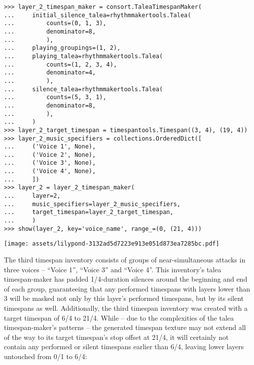 \begin{comment}
<abjad>
layer_2_timespan_maker = consort.TaleaTimespanMaker(
    initial_silence_talea=rhythmmakertools.Talea(
        counts=(0, 1, 3),
        denominator=8,
        ),
    playing_groupings=(1, 2),
    playing_talea=rhythmmakertools.Talea(
        counts=(1, 2, 3, 4),
        denominator=4,
        ),
    silence_talea=rhythmmakertools.Talea(
        counts=(5, 3, 1),
        denominator=8,
        ),
    )
layer_2_target_timespan = timespantools.Timespan((3, 4), (19, 4))
layer_2_music_specifiers = collections.OrderedDict([
    ('Voice 1', None),
    ('Voice 2', None),
    ('Voice 3', None),
    ('Voice 4', None),
    ])
layer_2 = layer_2_timespan_maker(
    layer=2,
    music_specifiers=layer_2_music_specifiers,
    target_timespan=layer_2_target_timespan,
    )
show(layer_2, key='voice_name', range_=(0, (21, 4)))
</abjad>
\end{comment}

\begin{abjadbookoutput}
\begin{singlespacing}
\vspace{-0.5\baselineskip}
\begin{verbatim}
>>> layer_2_timespan_maker = consort.TaleaTimespanMaker(
...     initial_silence_talea=rhythmmakertools.Talea(
...         counts=(0, 1, 3),
...         denominator=8,
...         ),
...     playing_groupings=(1, 2),
...     playing_talea=rhythmmakertools.Talea(
...         counts=(1, 2, 3, 4),
...         denominator=4,
...         ),
...     silence_talea=rhythmmakertools.Talea(
...         counts=(5, 3, 1),
...         denominator=8,
...         ),
...     )
>>> layer_2_target_timespan = timespantools.Timespan((3, 4), (19, 4))
>>> layer_2_music_specifiers = collections.OrderedDict([
...     ('Voice 1', None),
...     ('Voice 2', None),
...     ('Voice 3', None),
...     ('Voice 4', None),
...     ])
>>> layer_2 = layer_2_timespan_maker(
...     layer=2,
...     music_specifiers=layer_2_music_specifiers,
...     target_timespan=layer_2_target_timespan,
...     )
>>> show(layer_2, key='voice_name', range_=(0, (21, 4)))
\end{verbatim}
\noindent\texttt{[image: assets/lilypond-3132ad5d7223e913e051d873ea7285bc.pdf]}
\end{singlespacing}
\end{abjadbookoutput}

\noindent The third timespan inventory consists of groups of near-simultaneous
attacks in three voices -- \enquote{Voice 1}, \enquote{Voice 3} and
\enquote{Voice 4}. This inventory's talea timespan-maker has padded
1/4-duration silences around the beginning and end of each group, guaranteeing
that any performed timespans with layers lower than 3 will be masked not only
by this layer's performed timespans, but by its silent timespans as well.
Additionally, the third timespan inventory was created with a target timespan
of 6/4 to 21/4. While -- due to the complexities of the talea timespan-maker's
patterns -- the generated timespan texture may not extend all of the way to its
target timespan's stop offset at 21/4, it will certainly not contain any
performed or silent timespans earlier than 6/4, leaving lower layers untouched
from 0/1 to 6/4:

